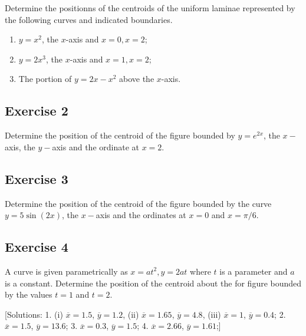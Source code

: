 \documentclass[
  english,
  11pt,
  oneside]{book}
\providecommand{\tightlist}{%
  \setlength{\itemsep}{0pt}\setlength{\parskip}{0pt}}
\newcommand{\slide}{}
\theoremstyle{definition}
\theoremstyle{definition}
\theoremstyle{definition}
\theoremstyle{definition}
\theoremstyle{remark}
\begin{document}
Determine the positionns of the centroids of the uniform laminae represented by the following curves and indicated boundaries.

\begin{enumerate}
\def\labelenumi{\roman{enumi}.}
\tightlist
\item
  \(y=x^2\), the \(x\)-axis and \(x=0, x=2\);
\item
  \(y=2x^3\), the \(x\)-axis and \(x=1, x=2\);
\item
  The portion of \(y=2x-x^2\) above the \(x\)-axis.
\end{enumerate}

\slide

\subsection*{Exercise 2}\label{exercise-2-11}

Determine the position of the centroid of the figure bounded by \(y = e^{2x}\), the \(x-\)axis, the \(y-\)axis and the ordinate at \(x = 2\).

\slide

\subsection*{Exercise 3}\label{exercise-3-9}

Determine the position of the centroid of the figure bounded by the curve \(y = 5\sin(2x)\), the \(x-\)axis and the ordinates at \(x = 0\) and \(x = \pi/6\).

\slide

\subsection*{Exercise 4}\label{exercise-4-7}

A curve is given parametrically as \(x = at^2, y = 2at\) where \(t\) is a parameter and \(a\) is a constant. Determine the position of the centroid about the for figure bounded by the values \(t = 1\) and \(t = 2\).

{[}Solutions:
1.
(i) \(\overline{x}=1.5\), \(\overline{y}=1.2\),
(ii) \(\overline{x}=1.65\), \(\overline{y}=4.8\),
(iii) \(\overline{x}=1\), \(\overline{y}=0.4\);
2. \(\overline{x}=1.5\), \(\overline{y}=13.6\);
3. \(\overline{x}=0.3\), \(\overline{y}=1.5\);
4. \(\overline{x}=2.66\), \(\overline{y}=1.61\);{]}
\end{document}
